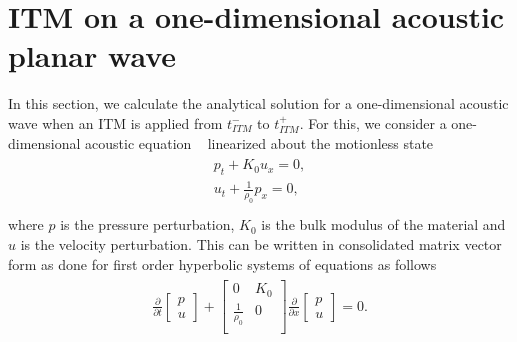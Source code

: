 \section{\texorpdfstring{\ac{ITM} on a one-dimensional acoustic planar wave}{ITM on a one-dimensional acoustic planar wave}}\label{section:ITMAcoustic}
In this section, we calculate the analytical solution for a one-dimensional acoustic wave when an \ac{ITM} is applied from $t_{ITM}^-$ to $t_{ITM}^+$.
For this, we consider a one-dimensional acoustic equation ~\parencite[Sec. 2.8]{leveque_2002} linearized about the motionless state
\begin{align}
    \begin{split}
        p_t + K_0u_x = 0, \\
        u_t + \frac{1}{\rho_0}p_x = 0 ,\\
    \end{split}
\end{align}
where $p$ is the pressure perturbation, $K_0$ is the bulk modulus of the material and $u$ is the velocity perturbation. 
This can be written in consolidated matrix vector form as done for first order hyperbolic systems of equations as follows
\begin{align}
    \begin{split}
        \frac{\partial }{\partial t}
    \begin{bmatrix}
        p \\
        u
    \end{bmatrix} + 
    \begin{bmatrix}
        0 & K_0 \\
        \frac{1}{\rho_0} & 0 \\
    \end{bmatrix}
    \frac{\partial }{\partial x}
    \begin{bmatrix}
        p \\
        u
    \end{bmatrix} = 0 .
    \end{split}
    \label{eq:acoustic}
\end{align}

